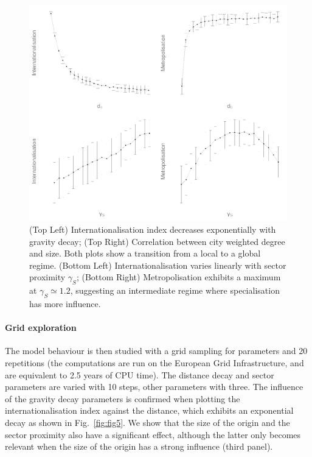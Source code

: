 \documentclass[10pt,letterpaper]{article}
\begin{document}
\begin{figure}
	\begin{center}
	    \includegraphics[width=\linewidth]{figures/Fig4.png}
	\end{center}
    \caption{(Top Left) Internationalisation index decreases exponentially with gravity decay; (Top Right) Correlation between city weighted degree and size. Both plots show a transition from a local to a global regime. (Bottom Left) Internationalisation varies linearly with sector proximity $\gamma_S$; (Bottom Right) Metropolisation exhibits a maximum at $\gamma_S \simeq 1.2$, suggesting an intermediate regime where specialisation has more influence. \label{fig:fig4}}
\end{figure}



\paragraph{Grid exploration}

The model behaviour is then studied with a grid sampling for parameters and 20 repetitions (the computations are run on the European Grid Infrastructure, and are equivalent to 2.5 years of CPU time). The distance decay and sector parameters are varied with 10 steps, other parameters with three. The influence of the gravity decay parameters is confirmed when plotting the internationalisation index against the distance, which exhibits an exponential decay as shown in Fig.~\ref{fig:fig5}. We show that the size of the origin and the sector proximity also have a significant effect, although the latter only becomes relevant when the size of the origin has a strong influence (third panel).
\end{document}
